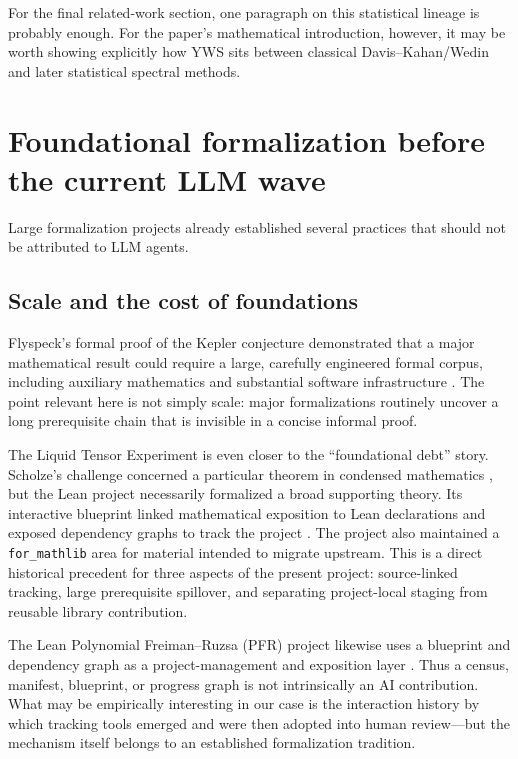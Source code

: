 \documentclass[11pt]{article}
\begin{document}
For the final related-work section, one paragraph on this statistical lineage is
probably enough.  For the paper's mathematical introduction, however, it may be
worth showing explicitly how YWS sits between classical Davis--Kahan/Wedin and
later statistical spectral methods.

\section{Foundational formalization before the current LLM wave}
\label{sec:prellm}

Large formalization projects already established several practices that should
not be attributed to LLM agents.

\subsection{Scale and the cost of foundations}

Flyspeck's formal proof of the Kepler conjecture demonstrated that a major
mathematical result could require a large, carefully engineered formal corpus,
including auxiliary mathematics and substantial software infrastructure
\citep{hales2017kepler}.  The point relevant here is not simply scale: major
formalizations routinely uncover a long prerequisite chain that is invisible in
a concise informal proof.

The Liquid Tensor Experiment is even closer to the ``foundational debt'' story.
Scholze's challenge concerned a particular theorem in condensed mathematics
\citep{scholze2022liquid}, but the Lean project necessarily formalized a broad
supporting theory.  Its interactive blueprint linked mathematical exposition to
Lean declarations and exposed dependency graphs to track the project
\citep{liquidblueprint2023}.  The project also maintained a \texttt{for\_mathlib}
area for material intended to migrate upstream.  This is a direct historical
precedent for three aspects of the present project: source-linked tracking,
large prerequisite spillover, and separating project-local staging from reusable
library contribution.

The Lean Polynomial Freiman--Ruzsa (PFR) project likewise uses a blueprint and
dependency graph as a project-management and exposition layer
\citep{pfrblueprint2024}.  Thus a census, manifest, blueprint, or progress graph
is not intrinsically an AI contribution.  What may be empirically interesting
in our case is the interaction history by which tracking tools emerged and were
then adopted into human review---but the mechanism itself belongs to an
established formalization tradition.
\end{document}
